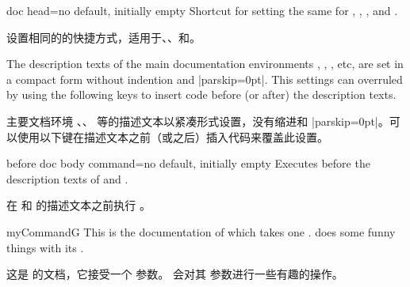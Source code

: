 \begin{docTcbKey}[][doc updated=2019-09-18]{doc head}{=}{no default, initially empty}
Shortcut for setting the same  for
, ,
, and .

设置相同的的快捷方式，适用于、、和。
\end{docTcbKey}



The description texts of the main documentation environments ,
, , etc, are set in a compact form without
indention and |parskip=0pt|. This settings can overruled by using the following
keys to insert code before (or after) the description texts.

主要文档环境 、、 等的描述文本以紧凑形式设置，没有缩进和 |parskip=0pt|。可以使用以下键在描述文本之前（或之后）插入代码来覆盖此设置。
\begin{docTcbKey}[][doc new=2015-10-09]{before doc body command}{=}{no default, initially empty}
Executes  before the description texts
of  and .

在  和  的描述文本之前执行 。
\begin{dispExample}

\begin{docCommand*}{myCommandG}{}
This is the documentation of  which takes one .
 does some funny things with its .

这是  的文档，它接受一个  参数。  会对其  参数进行一些有趣的操作。
\end{docCommand*}
\end{dispExample}
\end{docTcbKey}


